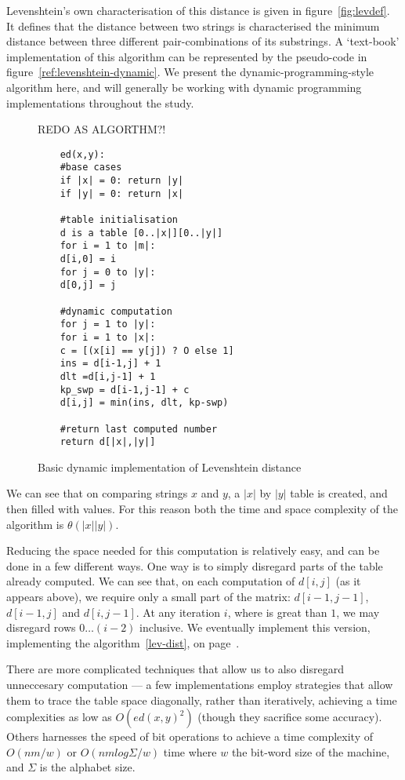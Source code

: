 Levenshtein's own characterisation of this distance is given in
figure~\ref{fig:levdef}. It defines that the distance between two
strings is characterised the minimum distance between three different
pair-combinations of its substrings. A `text-book' implementation of
this algorithm can be represented by the pseudo-code in
figure~\ref{ref:levenshtein-dynamic}. We present the
dynamic-programming-style algorithm here, and will generally be
working with dynamic programming implementations throughout the study.

\begin{figure}
  REDO AS ALGORTHM?!
  \centering
  \begin{lstlisting}
    ed(x,y):
    #base cases
    if |x| = 0: return |y|
    if |y| = 0: return |x|    

    #table initialisation
    d is a table [0..|x|][0..|y|]
    for i = 1 to |m|:
    d[i,0] = i
    for j = 0 to |y|:
    d[0,j] = j           
    
    #dynamic computation
    for j = 1 to |y|:
    for i = 1 to |x|:
    c = [(x[i] == y[j]) ? O else 1]
    ins = d[i-1,j] + 1
    dlt =d[i,j-1] + 1
    kp_swp = d[i-1,j-1] + c
    d[i,j] = min(ins, dlt, kp-swp)
    
    #return last computed number
    return d[|x|,|y|]
  \end{lstlisting}
  \caption{Basic dynamic implementation of Levenshtein distance}
  \label{fig:levenshtein-dynamic}
\end{figure}

We can see that on comparing strings $x$ and $y$, a
$|x|$ by $|y|$ table is created, and then filled with values. For this
reason both the time and space complexity of the algorithm is $\theta
(|x||y|)$.

Reducing the space needed for this computation is relatively easy, and
can be done in a few different ways. One way is to simply disregard
parts of the table already computed. We can see that, on each
computation of $d[i,j]$ (as it appears above), we require only a small
part of the matrix: $d[i-1,j-1]$, $d[i-1,j]$ and $d[i,j-1]$. At any
iteration $i$, where is great than $1$, we may disregard rows $0 \dots
(i-2)$ inclusive. We eventually implement this version, implementing
the algorithm~\ref{lev-dist}, on page~\pageref{lev-dist}.

There are more complicated techniques that allow us to also disregard
unneccesary computation --- a few implementations employ strategies
that allow them to trace the table space diagonally, rather than
iteratively, achieving a time complexities as low as $O(ed(x, y)^2)$
(though they sacrifice some accuracy).\cite{Chang1992} Others
harnesses the speed of bit operations to achieve a time complexity of
$O(nm/w)$ or $O(nm log {\Sigma}/w)$ time where $w$ the bit-word size
of the machine, and $\Sigma$ is the alphabet
size.\cite{Myers1999}\cite{Hyyro2003}

